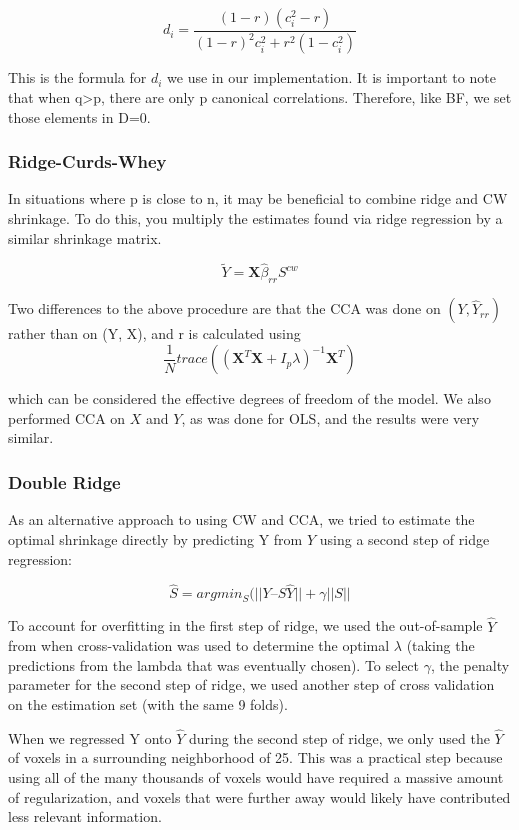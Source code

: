 \documentclass{article}
\begin{document}
\[ d_i = \frac{(1-r)(c_i^2-r)}{(1-r)^2c_i^2 + r^2(1-c_i^2)} \]

This is the formula for $d_i$  we use in our implementation. It is important to note that
when q\textgreater{}p, there are only p canonical correlations.
Therefore, like BF, we set those elements in D=0.

\subsubsection{Ridge-Curds-Whey}\label{ridge-curds-whey}

In situations where p is close to n, it may be beneficial to combine
ridge and CW shrinkage. To do this, you multiply the estimates found via
ridge regression by a similar shrinkage matrix.

\[  \tilde Y= \textbf{X} \hat \beta_{rr} S^{cw} \]

Two differences to the above procedure are that the CCA was done on $
(Y, \hat Y_{rr}) $ rather than on (Y, X), and r is calculated
using 
\[ \frac{1}{N} trace ((\textbf{X}^T \textbf{X} + I_p \lambda )^{-1} \textbf{X}^T) \]

which can be considered the effective degrees of freedom of the model. We also performed CCA on $X$ and $Y$, as was done for OLS, and the results were very similar. 
\subsubsection{Double Ridge}\label{double-ridge}

As an alternative approach to using CW and CCA, we tried to estimate the
optimal shrinkage directly by predicting Y from $ \hat Y $ using a second step of ridge regression:

\[ \hat S = argmin_{S} (||Y –  S  \hat Y|| + \gamma|| S|| \]

To account for overfitting in the first step of ridge, we used the out-of-sample $ \hat Y $ from when cross-validation was used to determine the optimal $\lambda$ (taking the predictions from the lambda that was eventually chosen). To select $\gamma$, the penalty parameter for the second step of ridge, we used another step of cross validation on the estimation set (with the same 9 folds).

When we regressed Y onto $ \hat Y $ during the second step of ridge, we only used the $ \hat Y $ of voxels in a surrounding neighborhood of 25. This was a practical step because using all of the many thousands of voxels would have required a massive  amount of regularization, and voxels that were further away would likely have contributed less relevant information. 
\end{document}
